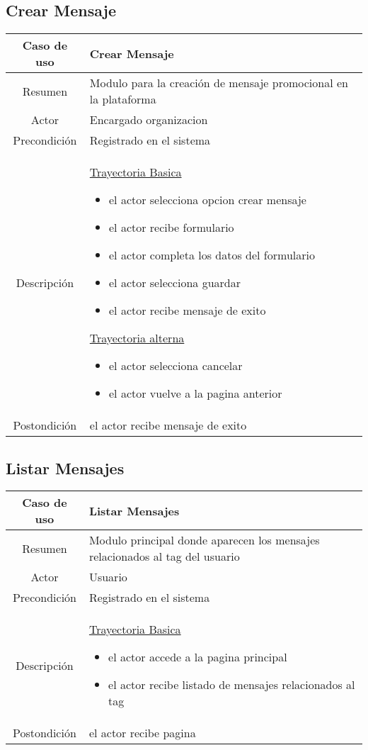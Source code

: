 \documentclass[letterpaper,openright,10pt,oneside]{report}
\begin{document}
\subsection{Crear Mensaje}

\begin{tabular}{|c|p{110mm}|}
\hline
	Caso de uso & Crear Mensaje\\
\hline
	Resumen & Modulo para la creación de mensaje promocional en la plataforma\\
\hline
	Actor & Encargado organizacion\\
\hline
	Precondición & Registrado en el sistema\\
\hline
	Descripción & 
	\underline{Trayectoria Basica}
	\begin{itemize}
		\item el actor selecciona opcion crear mensaje
		\item el actor recibe formulario
		\item el actor completa los datos del formulario
		\item el actor selecciona guardar
		\item el actor recibe mensaje de exito
	\end{itemize}
	\underline{Trayectoria alterna}
	\begin{itemize}
		\item el actor selecciona cancelar
		\item el actor vuelve a la pagina anterior
	\end{itemize}\\
\hline
	Postondición & el actor recibe mensaje de exito\\
\hline

\end{tabular}

\subsection{Listar Mensajes}

\begin{tabular}{|c|p{110mm}|}
\hline
	Caso de uso & Listar Mensajes\\
\hline
	Resumen & Modulo principal donde aparecen los mensajes relacionados al tag del usuario\\
\hline
	Actor & Usuario\\
\hline
	Precondición & Registrado en el sistema\\
\hline
	Descripción & 
	\underline{Trayectoria Basica}
	\begin{itemize}
		\item el actor accede a la pagina principal
		\item el actor recibe listado de mensajes relacionados al tag
	\end{itemize}
	\\
\hline
	Postondición & el actor recibe pagina\\
\hline
\end{tabular}
\end{document}
